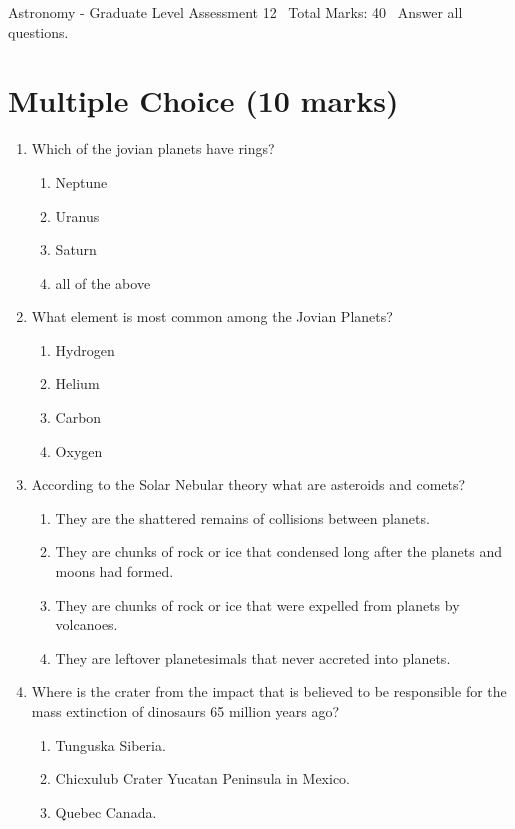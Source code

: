 \documentclass[12pt]{article}
\begin{document}
\begin{center}
Astronomy - Graduate Level Assessment 12 \
Total Marks: 40 \
Answer all questions.
\end{center}

\section*{Multiple Choice (10 marks)}
\begin{enumerate}[label=\arabic*.]
\item Which of the jovian planets have rings?
\begin{enumerate}[label=(\alph*)]
    \item Neptune
    \item Uranus
    \item Saturn
    \item all of the above
\end{enumerate}
\item What element is most common among the Jovian Planets?
\begin{enumerate}[label=(\alph*)]
    \item Hydrogen
    \item Helium
    \item Carbon
    \item Oxygen
\end{enumerate}
\item According to the Solar Nebular theory what are asteroids and comets?
\begin{enumerate}[label=(\alph*)]
    \item They are the shattered remains of collisions between planets.
    \item They are chunks of rock or ice that condensed long after the planets and moons had formed.
    \item They are chunks of rock or ice that were expelled from planets by volcanoes.
    \item They are leftover planetesimals that never accreted into planets.
\end{enumerate}
\item Where is the crater from the impact that is believed to be responsible for the mass extinction of dinosaurs 65 million years ago?
\begin{enumerate}[label=(\alph*)]
    \item Tunguska Siberia.
    \item Chicxulub Crater Yucatan Peninsula in Mexico.
    \item Quebec Canada.

\end{enumerate}
\end{enumerate}
\end{document}
